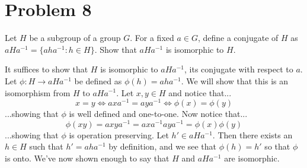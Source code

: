 \documentclass{article}
\begin{document}
\pagebreak
\section*{Problem 8}

Let $H$ be a subgroup of a group $G$.  For a fixed $a\in G$, define a conjugate
of $H$ as $aHa^{-1}=\{aha^{-1}:h\in H\}$.  Show that $aHa^{-1}$ is isomorphic to $H$.

It suffices to show that $H$ is isomorphic to $aHa^{-1}$, its conjugate with
respect to $a$.  Let $\phi:H\to aHa^{-1}$ be defined as $\phi(h)=aha^{-1}$.
We will show that this is an isomorphism from $H$ to $aHa^{-1}$.
Let $x,y\in H$ and notice that...
\begin{equation*}
x=y \iff axa^{-1} = aya^{-1} \iff \phi(x)=\phi(y)
\end{equation*}
...showing that $\phi$ is well defined and one-to-one.
Now notice that...
\begin{equation*}
\phi(xy) = axya^{-1} = axa^{-1}aya^{-1} = \phi(x)\phi(y)
\end{equation*}
...showing that $\phi$ is operation preserving.  Let $h'\in aHa^{-1}$.
Then there exists an $h\in H$ such that $h'=aha^{-1}$ by definition, and
we see that $\phi(h)=h'$ so that $\phi$ is onto.
We've now shown enough to say that $H$ and $aHa^{-1}$ are isomorphic.
\end{document}
